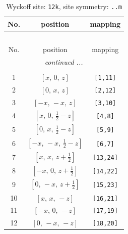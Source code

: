 \documentclass[fleqn,8pt]{jsarticle}
\begin{document}
\begin{longtable}{ccc}
\caption{Wyckoff site: {\tt 12k}, site symmetry: {\tt ..m}}
 \\
 \hline \hline
No. & position & mapping \\ \hline \endfirsthead

\multicolumn{2}{l}{\tablename\ \thetable{}} \\
 \hline \hline
No. & position & mapping \\ \hline \endhead

 \hline \hline
\multicolumn{2}{r}{\footnotesize\it continued ...} \\ \endfoot

 \hline \hline
\multicolumn{2}{r}{} \\ \endlastfoot

1 & $\left[ x,\, 0,\, z \right]$ & {\tt [1,11]} \\ \hline
2 & $\left[ 0,\, x,\, z \right]$ & {\tt [2,12]} \\ \hline
3 & $\left[ - x,\, - x,\, z \right]$ & {\tt [3,10]} \\ \hline
4 & $\left[ x,\, 0,\, \frac{1}{2} - z \right]$ & {\tt [4,8]} \\ \hline
5 & $\left[ 0,\, x,\, \frac{1}{2} - z \right]$ & {\tt [5,9]} \\ \hline
6 & $\left[ - x,\, - x,\, \frac{1}{2} - z \right]$ & {\tt [6,7]} \\ \hline
7 & $\left[ x,\, x,\, z + \frac{1}{2} \right]$ & {\tt [13,24]} \\ \hline
8 & $\left[ - x,\, 0,\, z + \frac{1}{2} \right]$ & {\tt [14,22]} \\ \hline
9 & $\left[ 0,\, - x,\, z + \frac{1}{2} \right]$ & {\tt [15,23]} \\ \hline
10 & $\left[ x,\, x,\, - z \right]$ & {\tt [16,21]} \\ \hline
11 & $\left[ - x,\, 0,\, - z \right]$ & {\tt [17,19]} \\ \hline
12 & $\left[ 0,\, - x,\, - z \right]$ & {\tt [18,20]} \\
\end{longtable}
\renewcommand{\arraystretch}{1.2}
\end{document}
